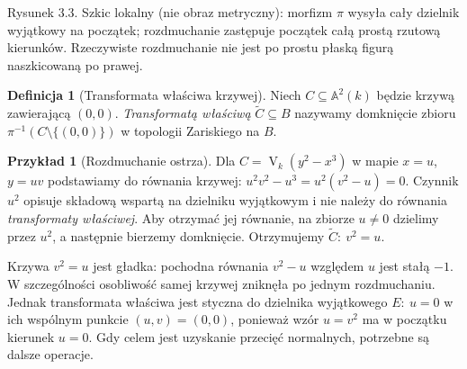 \documentclass[11pt,a4paper,openany]{report}
\numberwithin{equation}{section}
\theoremstyle{plain}
\theoremstyle{definition}
\newtheorem{definicja}[twierdzenie]{Definicja}
\newtheorem{przyklad}[twierdzenie]{Przykład}
\theoremstyle{remark}
\newcommand{\A}{\mathbb A}
\newcommand{\PP}{\mathbb P}
\newcommand{\V}{\operatorname V}
\begin{document}
\noindent\begin{minipage}{\linewidth}\centering
{}

\small Rysunek 3.3. Szkic lokalny (nie obraz metryczny): morfizm $\pi$ wysyła cały dzielnik wyjątkowy na początek; rozdmuchanie zastępuje początek
całą prostą rzutową kierunków. Rzeczywiste rozdmuchanie nie jest
po prostu płaską figurą naszkicowaną po prawej.
\end{minipage}

\begin{definicja}[Transformata właściwa krzywej]
Niech $C\subseteq\A^2(k)$ będzie krzywą zawierającą
$(0,0)$. \emph{Transformatą właściwą} $\widetilde C\subseteq B$
nazywamy domknięcie zbioru $\pi^{-1}(C\setminus\{(0,0)\})$
w topologii Zariskiego na $B$.
\end{definicja}

\begin{przyklad}[Rozdmuchanie ostrza]
Dla $C=\V_k(y^2-x^3)$ w mapie $x=u$, $y=uv$
podstawiamy do równania krzywej:
$u^2v^2-u^3=u^2(v^2-u)=0$.
Czynnik $u^2$ opisuje składową wspartą na dzielniku
wyjątkowym i nie należy do równania \emph{transformaty
właściwej}. Aby otrzymać jej równanie, na zbiorze $u\ne0$
dzielimy przez $u^2$, a następnie bierzemy domknięcie.
Otrzymujemy $\widetilde C:\ v^2=u$.

Krzywa $v^2=u$ jest gładka: pochodna równania
$v^2-u$ względem $u$ jest stałą $-1$.
W szczególności osobliwość samej krzywej zniknęła po
jednym rozdmuchaniu. Jednak transformata właściwa
jest styczna do dzielnika wyjątkowego $E:\ u=0$
w ich wspólnym punkcie $(u,v)=(0,0)$, ponieważ
wzór $u=v^2$ ma w początku kierunek $u=0$.
Gdy celem jest uzyskanie przecięć normalnych, potrzebne
są dalsze operacje.
\end{przyklad}
\end{document}
